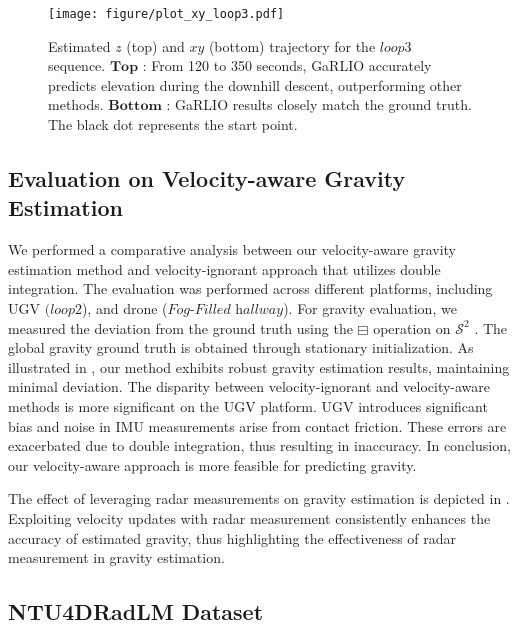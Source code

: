 
\begin{figure}[!t]
    \centering
    \texttt{[image: figure/plot\_xy\_loop3.pdf]}
    \caption{Estimated $z$ (top) and $xy$ (bottom) trajectory for the $\textit{loop3}$ sequence. $\textbf{Top}$ : From 120 to 350 seconds, GaRLIO accurately predicts elevation during the downhill descent, outperforming other methods. $\textbf{Bottom}$ : GaRLIO results closely match the ground truth. The black dot represents the start point. }
    \label{fig:loop3}
    \vspace{-7mm}
\end{figure}

\subsection{Evaluation on Velocity-aware Gravity Estimation}
\label{subsec:gravity test}
We performed a comparative analysis between our velocity-aware gravity estimation method and velocity-ignorant approach that utilizes double integration. The evaluation was performed across different platforms, including \ac{UGV} $(\textit{loop2}$), and drone ($\textit{Fog-Filled hallway}$). For gravity evaluation, we measured the deviation from the ground truth using the $\boxminus$ operation on $\mathcal{S}^2$ \cite{he2021kalman}. The global gravity ground truth is obtained through stationary initialization. As illustrated in , our method exhibits robust gravity estimation results, maintaining minimal deviation. The disparity between velocity-ignorant and velocity-aware methods is more significant on the \ac{UGV} platform. 
\ac{UGV} introduces significant bias and noise in \ac{IMU} measurements arise from contact friction. These errors are exacerbated due to double integration, thus resulting in inaccuracy. In conclusion, our velocity-aware approach is more feasible for predicting gravity.

The effect of leveraging radar measurements on gravity estimation is depicted in . Exploiting velocity updates with radar measurement consistently enhances the accuracy of estimated gravity, thus highlighting the effectiveness of radar measurement in gravity estimation.

\subsection{NTU4DRadLM Dataset}
\label{subsec:ntu}

